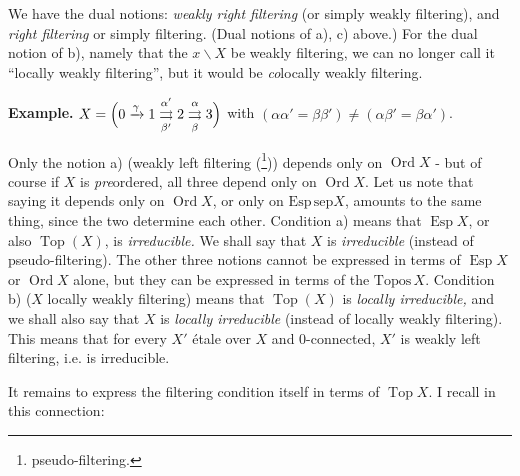 \documentclass[11pt]{article}
\newcommand{\printedpage}[1]{\marginpar{\footnotesize p.~#1}}
\newcommand{\msp}[1]{\marginpar{\footnotesize [#1]}}
\begin{document}
\printedpage{11}

\noindent We have the dual notions: \textit{weakly right filtering} (or simply weakly filtering), and \textit{right filtering} or simply filtering. (Dual notions of a), c) above.) For the dual notion of b), namely that the $x\backslash X$ be weakly filtering, we can no longer call it ``locally weakly filtering'', but it would be \textit{co}locally weakly filtering.

\noindent\textbf{Example.} $X = \Bigl(0 \xrightarrow{\gamma} 1 \underset{\beta'}{\overset{\alpha'}{\rightrightarrows}} 2 \underset{\beta}{\overset{\alpha}{\rightrightarrows}} 3\Bigr)$ with $(\alpha\alpha' = \beta\beta') \neq (\alpha\beta' = \beta\alpha')$.

\msp{page 17}

\noindent Only the notion a) (weakly left filtering (\footnote[22]{pseudo-filtering.})) depends only on $\operatorname{Ord} X$ - but of course if $X$ is \textit{pre}ordered, all three depend only on $\operatorname{Ord} X$. Let us note that saying it depends only on $\operatorname{Ord} X$, or only on $\mathrm{Esp}\,\mathrm{sep}X$, amounts to the same thing, since the two determine each other. Condition a) means that $\operatorname{Esp} X$, or also $\operatorname{Top}(X)$, is \textit{irreducible.} We shall say that $X$ is \textit{irreducible} (instead of pseudo-filtering). The other three notions cannot be expressed in terms of $\operatorname{Esp} X$ or $\operatorname{Ord} X$ alone, but they can be expressed in terms of the $\mathrm{Topos}\, X$. Condition b) ($X$ locally weakly filtering) means that $\operatorname{Top}(X)$ is \textit{locally irreducible,} and we shall also say that $X$ is \textit{locally irreducible} (instead of locally weakly filtering). This means that for every $X'$ étale over $X$ and 0-connected, $X'$ is weakly left filtering, i.e. is irreducible.

It remains to express the filtering condition itself in terms of $\operatorname{Top} X$. I recall in this connection:
\end{document}
